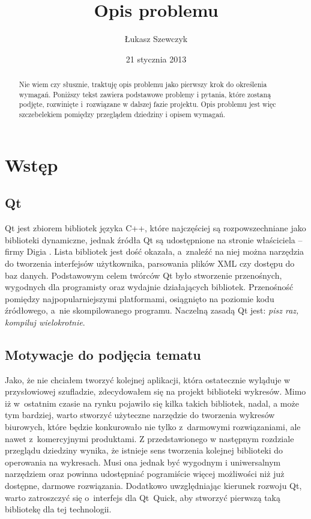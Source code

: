 \documentclass[11pt,twoside,a4paper,final]{llncs}
\begin{document}
\date{21 stycznia 2013}
\title{Opis problemu}

\author{Łukasz Szewczyk}

\maketitle

\begin{abstract}
Nie wiem czy słusznie, traktuję opis problemu jako pierwszy krok do określenia wymagań. Poniższy tekst zawiera podstawowe problemy i pytania, które zostaną podjęte, rozwinięte i~rozwiązane w dalszej fazie projektu. Opis problemu jest więc szczebelekiem pomiędzy przeglądem dziedziny i opisem wymagań.
\end{abstract}

\section{Wstęp}
\subsection{Qt}
Qt jest zbiorem bibliotek języka C++, które najczęściej są rozpowszechniane jako biblioteki dynamiczne, jednak źródła Qt są udostępnione na stronie właściciela -- firmy Digia \cite{digia}. Lista bibliotek jest dość okazała, a~znaleźć na niej można narzędzia do tworzenia interfejsów użytkownika, parsowania plików XML czy dostępu do baz danych. Podstawowym celem twórców Qt było stworzenie przenośnych, wygodnych dla programisty oraz wydajnie działających bibliotek. Przenośność pomiędzy najpopularniejszymi platformami, osiągnięto na poziomie kodu źródłowego, a~nie skompilowanego programu. Naczelną zasadą Qt jest: \textit{pisz raz, kompiluj wielokrotnie}. 

\subsection{Motywacje do podjęcia tematu}
Jako, że nie chciałem tworzyć kolejnej aplikacji, która ostatecznie wyląduje w przysłowiowej szufladzie, zdecydowałem się na projekt biblioteki wykresów. Mimo iż w~ostatnim czasie na rynku pojawiło się kilka takich bibliotek, nadal, a może tym bardziej, warto stworzyć użyteczne narzędzie do tworzenia wykresów biurowych, które będzie konkurowało nie tylko z~darmowymi rozwiązaniami, ale nawet z~komercyjnymi produktami. Z przedstawionego w następnym rozdziale przeglądu dziedziny wynika, że istnieje sens tworzenia kolejnej biblioteki do operowania na wykresach. Musi ona jednak być wygodnym i uniwersalnym narzędziem oraz powinna udostępniać pogramiście więcej możliwości niż już dostępne, darmowe rozwiązania. Dodatkowo uwzględniając kierunek rozwoju Qt, warto zatroszczyć się o~interfejs dla Qt~Quick, aby stworzyć pierwszą taką bibliotekę dla tej technologii.
\end{document}
